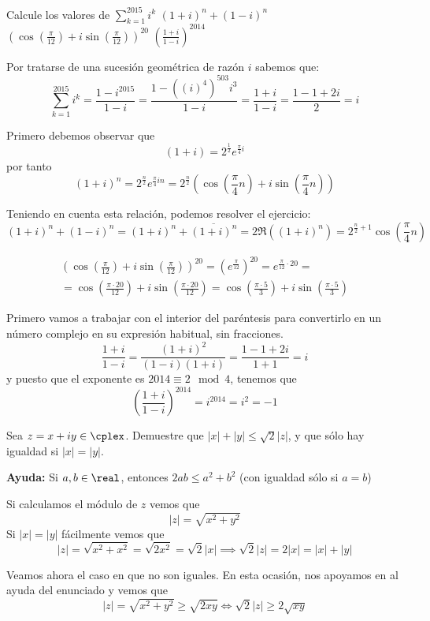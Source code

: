 \begin{problem}[2]
Calcule los valores de
\ppart $\displaystyle \sum_{k=1}^{2015}i^k$
\ppart $\displaystyle (1+i)^n+(1-i)^n$
\ppart $\displaystyle \left( \cos \left( \frac{\pi}{12} \right) + i \sin \left( \frac{\pi}{12} \right)\right)^{20}$
\ppart $\displaystyle \left(\frac{1+i}{1-i}\right)^{2014}$
\solution

\spart
Por tratarse de una sucesión geométrica de razón $i$ sabemos que:
\[\sum_{k=1}^{2015}i^k = \frac{1-i^{2015}}{1-i}=\frac{1-\left((i)^4\right)^{503}i^3}{1-i}=\frac{1+i}{1-i}=\frac{1-1+2i}{2}=i\]

\spart
Primero debemos observar que
\large
\[(1+i) = 2^{\frac{1}{2}}e^{\frac{\pi}{4}i}\]
\normalsize
por tanto
\[ (1+i)^n= 2^{\frac{n}{2}}e^{\frac{\pi}{4}in} = 2^{\frac{n}{2}}\left(\cos\left(\frac{\pi}{4}n\right)+i \sin\left(\frac{\pi}{4}n\right)\right)\]

Teniendo en cuenta esta relación, podemos resolver el ejercicio:
\[(1+i)^n+(1-i)^n = (1+i)^n+\overline{(1+i)^n} = 2 \Re((1+i)^n)=2^{\frac{n}{2}+1}\cos\left(\frac{\pi}{4}n\right)\]

\spart
\begin{multline*}
\left( \cos \left( \frac{\pi}{12} \right) + i \sin \left( \frac{\pi}{12} \right)\right)^{20}=\left(e^{\frac{\pi}{12}}\right)^{20} = e^{\frac{\pi}{12}\cdot 20} =\\= \cos \left( \frac{\pi\cdot 20}{12} \right) + i \sin \left( \frac{\pi\cdot 20}{12} \right) = \cos \left( \frac{\pi\cdot 5}{3} \right) + i \sin \left( \frac{\pi \cdot 5}{3} \right)
\end{multline*}

\spart
Primero vamos a trabajar con el interior del paréntesis para convertirlo en un número complejo en su expresión habitual, sin fracciones.
\[\frac{1+i}{1-i}=\frac{(1+i)^2}{(1-i)(1+i)} = \frac{1-1+2i}{1+1} = i\]
y puesto que el exponente es $2014 \equiv 2 \mod 4$, tenemos que
\[\left(\frac{1+i}{1-i}\right)^{2014}=i^{2014} = i^2 = -1\]
\end{problem}

\begin{problem}[3]
Sea $z=x+iy \in \cplex$. Demuestre que $|x|+|y|\leq \sqrt{2}|z|$, y que sólo hay igualdad si $|x|=|y|$.

\textbf{Ayuda:} Si $a,b \in \real$, entonces $2ab \leq a^2 + b^2$ (con igualdad sólo si $a=b$)

\solution


Si calculamos el módulo de $z$ vemos que
\[|z|=\sqrt{x^2+y^2}\]
Si $|x|=|y|$ fácilmente vemos que
\[|z|=\sqrt{x^2+x^2}=\sqrt{2x^2}=\sqrt{2}|x| \implies \sqrt{2}|z|=2|x|=|x|+|y|\]

Veamos ahora el caso en que no son iguales. En esta ocasión, nos apoyamos en al ayuda del enunciado y vemos que
\[|z|=\sqrt{x^2+y^2} \geq \sqrt{2xy} \iff \sqrt{2}|z| \geq 2\sqrt{xy}\]


\end{problem}

